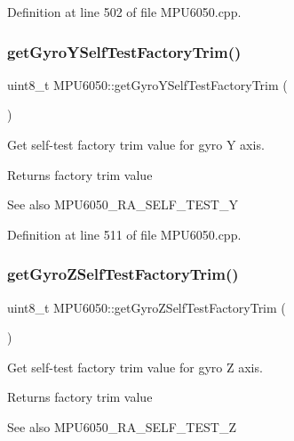 Definition at line 502 of file M\+P\+U6050.\+cpp.

\mbox{\label{classMPU6050_ae3e0610d6d3bb8162c4d5c99e0f53106}} 
\subsubsection{\texorpdfstring{getGyroYSelfTestFactoryTrim()}{getGyroYSelfTestFactoryTrim()}}
{\footnotesize\ttfamily uint8\+\_\+t M\+P\+U6050\+::get\+Gyro\+Y\+Self\+Test\+Factory\+Trim (\begin{DoxyParamCaption}{ }\end{DoxyParamCaption})}



Get self-\/test factory trim value for gyro Y axis. 

\begin{DoxyReturn}{Returns}
factory trim value 
\end{DoxyReturn}
\begin{DoxySeeAlso}{See also}
M\+P\+U6050\+\_\+\+R\+A\+\_\+\+S\+E\+L\+F\+\_\+\+T\+E\+S\+T\+\_\+Y 
\end{DoxySeeAlso}


Definition at line 511 of file M\+P\+U6050.\+cpp.

\mbox{\label{classMPU6050_a6aecb64dc804f1238e56626ae13b4c79}} 
\subsubsection{\texorpdfstring{getGyroZSelfTestFactoryTrim()}{getGyroZSelfTestFactoryTrim()}}
{\footnotesize\ttfamily uint8\+\_\+t M\+P\+U6050\+::get\+Gyro\+Z\+Self\+Test\+Factory\+Trim (\begin{DoxyParamCaption}{ }\end{DoxyParamCaption})}



Get self-\/test factory trim value for gyro Z axis. 

\begin{DoxyReturn}{Returns}
factory trim value 
\end{DoxyReturn}
\begin{DoxySeeAlso}{See also}
M\+P\+U6050\+\_\+\+R\+A\+\_\+\+S\+E\+L\+F\+\_\+\+T\+E\+S\+T\+\_\+Z 
\end{DoxySeeAlso}



